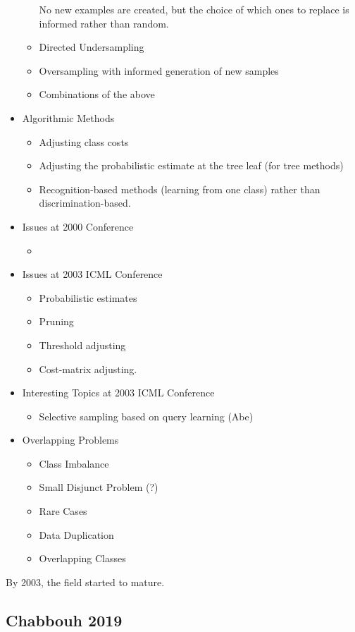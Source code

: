 \begin{itemize}
\begin{itemize}
		No new examples are created, but the choice of which ones to replace is informed rather than random.
		\item Directed Undersampling
		\item Oversampling with informed generation of new samples
		\item Combinations of the above
	\end{itemize}
	\item Algorithmic Methods
	\begin{itemize}
		\item Adjusting class costs
		\item Adjusting the probabilistic estimate at the tree leaf (for tree methods)
		\item Recognition-based methods (learning from one class) rather than discrimination-based.
	\end{itemize}
	\item Issues at 2000 Conference
	\begin{itemize}
		\item 
	\end{itemize}
	\item Issues at 2003 ICML Conference
	\begin{itemize}
		\item Probabilistic estimates
		\item Pruning
		\item Threshold adjusting
		\item Cost-matrix adjusting.
	\end{itemize}
	\item Interesting Topics at 2003 ICML Conference
	\begin{itemize}
		\item Selective sampling based on query learning (Abe)
	\end{itemize}
	\item Overlapping Problems
	\begin{itemize}
		\item Class Imbalance
		\item Small Disjunct Problem (?)
		\item Rare Cases
		\item Data Duplication
		\item Overlapping Classes
	\end{itemize}
\end{itemize}

By 2003, the field started to mature.  


\subsection{Chabbouh 2019}

